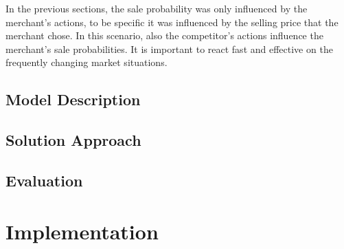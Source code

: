 In the previous sections, the sale probability was only influenced by the merchant's actions, to be specific it was influenced by the selling price that the merchant chose.
In this scenario, also the competitor's actions influence the merchant's sale probabilities.
It is important to react fast and effective on the frequently changing market situations.

\subsection{Model Description}
\subsection{Solution Approach}



\subsection{Evaluation}

\section{Implementation}
